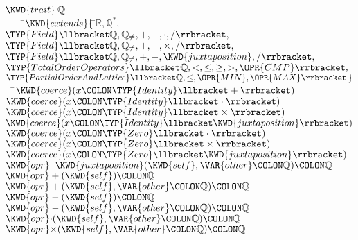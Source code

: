 \begin{Fortress}
\(\KWD{trait}\:\mathbb{Q}\)\\
{\tt~~~~}\pushtabs\=\+\(    \KWD{extends} \{\, \null\)\pushtabs\=\+\(\mathbb{R}, \mathbb{Q}^*,\)\\
\(              \TYP{Field}\llbracket\mathbb{Q},\mathbb{Q}_{\neq},+,-,\cdot,/\rrbracket,\)\\
\(              \TYP{Field}\llbracket\mathbb{Q},\mathbb{Q}_{\neq},+,-,\times,/\rrbracket,\)\\
\(              \TYP{Field}\llbracket\mathbb{Q},\mathbb{Q}_{\neq},+,-,\KWD{juxtaposition},/\rrbracket,\)\\
\(              \TYP{TotalOrderOperators}\llbracket\mathbb{Q},<,\leq,\geq,>,\OPR{CMP}\rrbracket,\)\\
\(              \TYP{PartialOrderAndLattice}\llbracket\mathbb{Q},\leq,\OPR{MIN},\OPR{MAX}\rrbracket\,\}\)\-\-\\\poptabs\poptabs
{\tt~~}\pushtabs\=\+\(  \KWD{coerce}(x\COLON \TYP{Identity}\llbracket+\rrbracket)\)\\
\(  \KWD{coerce}(x\COLON \TYP{Identity}\llbracket\cdot\rrbracket)\)\\
\(  \KWD{coerce}(x\COLON \TYP{Identity}\llbracket\times\rrbracket)\)\\
\(  \KWD{coerce}(x\COLON \TYP{Identity}\llbracket\KWD{juxtaposition}\rrbracket)\)\\
\(  \KWD{coerce}(x\COLON \TYP{Zero}\llbracket\cdot\rrbracket)\)\\
\(  \KWD{coerce}(x\COLON \TYP{Zero}\llbracket\times\rrbracket)\)\\
\(  \KWD{coerce}(x\COLON \TYP{Zero}\llbracket\KWD{juxtaposition}\rrbracket)\)\\
\(  \KWD{opr}\;\;\KWD{juxtaposition}(\KWD{self}, \VAR{other}\COLON \mathbb{Q})\COLON \mathbb{Q}\)\\
\(  \KWD{opr} +(\KWD{self})\COLON \mathbb{Q}\)\\
\(  \KWD{opr} +(\KWD{self}, \VAR{other}\COLON \mathbb{Q})\COLON \mathbb{Q}\)\\
\(  \KWD{opr} -(\KWD{self})\COLON \mathbb{Q}\)\\
\(  \KWD{opr} -(\KWD{self}, \VAR{other}\COLON \mathbb{Q})\COLON \mathbb{Q}\)\\
\(  \KWD{opr} \mathord{\cdot}(\KWD{self}, \VAR{other}\COLON \mathbb{Q})\COLON \mathbb{Q}\)\\
\(  \KWD{opr} \mathord{\times}(\KWD{self}, \VAR{other}\COLON \mathbb{Q})\COLON \mathbb{Q}\)\\

\end{Fortress}
